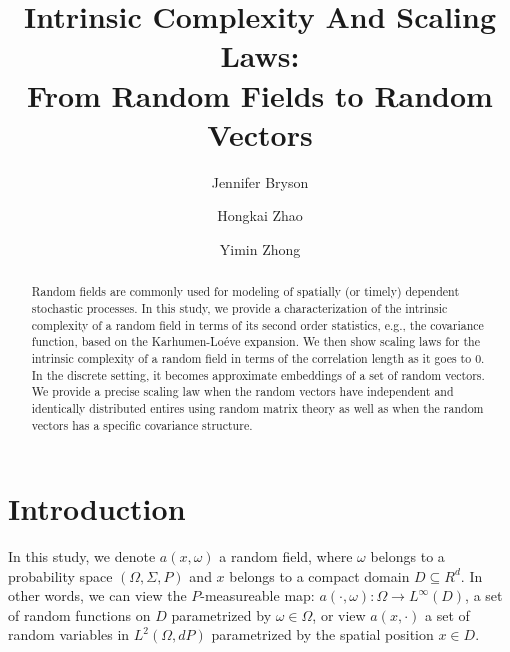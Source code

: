 \documentclass[11pt]{amsart}
\title{Intrinsic Complexity And Scaling Laws: \\ From Random Fields to Random Vectors }
\author{Jennifer Bryson}
\author{Hongkai Zhao}
\author{Yimin Zhong}
\newcommand{\w}{\omega}
\newcommand{\W}{\Omega}
\begin{document}
\begin{abstract}
Random fields are commonly used for modeling of spatially (or timely) dependent stochastic processes.  In this study, we provide a characterization of the intrinsic complexity of a random field in terms of its second order statistics, e.g., the covariance function,  based on the Karhumen-Lo\'{e}ve expansion. We then show scaling laws for the intrinsic complexity of a random field in terms of the correlation length as it goes to 0. 
In the discrete setting, it becomes approximate embeddings of a set of random vectors. We provide a precise scaling law when the random vectors have independent and identically distributed entires using random matrix theory as well as when the random vectors has a specific covariance structure.
\end{abstract}
\maketitle
\section{Introduction}
In this study, we denote $a(x,\w)$ a random field, where $\w$ belongs to a probability space $(\W, \Sigma,P)$ and $x$ belongs to a compact domain $D\subseteq R^d$. In other words, we can view the $P$-measureable map: $a(\cdot,\w): \W\rightarrow L^{\infty}(D)$, a set of random functions on $D$ parametrized by $\w \in \W $, or view $a(x,\cdot)$ a set of random variables in $L^2(\W, dP)$ parametrized by the spatial position $x\in D$. 
\end{document}
